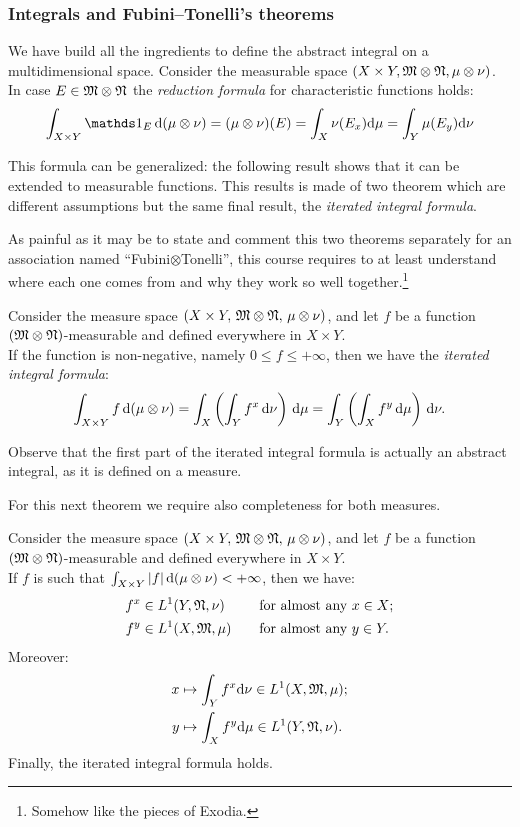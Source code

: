 \subsubsection{Integrals and Fubini--Tonelli's theorems} We have build all the ingredients to define the abstract integral on a multidimensional space. Consider the measurable space $(X\times Y, \mathfrak M \otimes \mathfrak N, \mu \otimes \nu)$. In case $ E \in \mathfrak M \otimes \mathfrak N$ the \textit{reduction formula} for characteristic functions holds:
$$\int_{X\times Y} \Ind_E \,\de(\mu \otimes \nu)
= (\mu \otimes \nu)(E) = \int_X \nu (E_x) \dmu = \int_Y \mu (E_y) \dnu$$


This formula can be generalized: the following result shows that it can be extended to measurable functions. This results is made of two theorem which are different assumptions but the same final result, the \textit{iterated integral formula}.

As painful as it may be to state and comment this two theorems separately for an association named ``Fubini$\otimes$Tonelli'', this course requires to at least understand where each one comes from and why they work so well together.\footnote{Somehow like the pieces of Exodia.} 

\begin{theo}[Tonelli] %
	Consider the measure space $(X\times Y,\, \mathfrak M \otimes \mathfrak N,\, \mu \otimes \nu)$, and let $f$ be a function $(\mathfrak M \otimes \mathfrak N)$-measurable and defined everywhere in $X\times Y$.\\
	If the function is non-negative, namely $0\leq f \leq +\infty$, then we have the \emph{iterated integral formula}:
	$$
	\int_{X\times Y} f \, \mathrm d (\mu \otimes \nu)
	= \int_X \left( \int_Y f^x \, \mathrm d \nu \right) \, \mathrm d \mu
	= \int_Y \left( \int_X f^y \, \mathrm d \mu \right) \, \mathrm d \nu.
	$$
\end{theo}
Observe that the first part of the iterated integral formula is actually an abstract integral, as it is defined on a measure.

For this next theorem we require also completeness for both measures.

\begin{theo}[Fubini]%
	Consider the measure space $(X\times Y,\, \mathfrak M \otimes \mathfrak N,\, \mu \otimes \nu)$, and let $f$ be a function $(\mathfrak M \otimes \mathfrak N)$-measurable and defined everywhere in $X\times Y$.\\
	If $f$ is such that $\int_{X\times Y} |f| \, \mathrm d (\mu \otimes \nu) < +\infty$, then we have: 
	\begin{alignat*}{2}
		f^x &\in L^1(Y, \mathfrak N, \nu) \quad &&\text{for almost any } x \in X; \\
		f^y &\in L^1(X, \mathfrak M, \mu) \quad &&\text{for almost any } y \in Y.
	\end{alignat*}
	Moreover:
	\begin{align*}
		x & \mapsto \int_Yf^x\mathrm d \nu\in L^1(X,\mathfrak M, \mu); \\
		y & \mapsto \int_Xf^y\mathrm d \mu\in L^1(Y,\mathfrak N, \nu).
	\end{align*}
	Finally, the iterated integral formula holds.
\end{theo}

